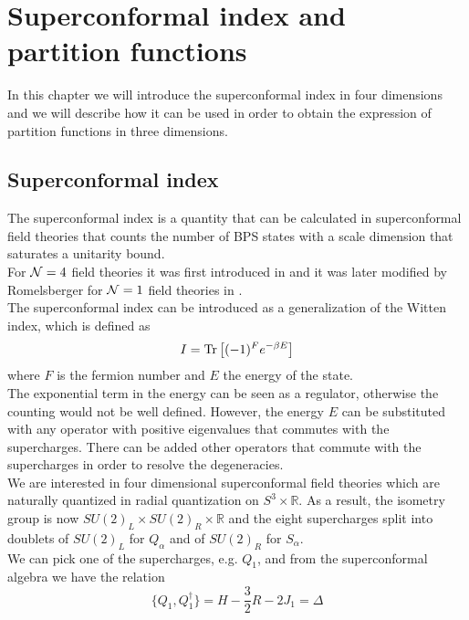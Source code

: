 

\chapter{Superconformal index and partition functions}

In this chapter we will introduce the superconformal index in four dimensions and we will describe how it can be used in order to obtain the expression of partition functions in three dimensions.\\
{\color{red}{ \LARGE Devo Aggiunger qualcosa}}


\section{Superconformal index}
The superconformal index is a quantity that can be calculated in superconformal field theories that counts the number of BPS states with a scale dimension that saturates a unitarity bound.\\
For $\mathcal{N}=4$ field theories it was first introduced in \cite{Kinney:2005ej}
and it was later modified by Romelsberger for $\mathcal{N}=1$ field theories in \cite{Romelsberger:2005eg}.\\
The superconformal index can be introduced as a generalization of the Witten index, which is defined as 
\begin{equation}
I = \mathrm{Tr } \,{ \left[   (-1)^F e^{-\beta E}\right]}
\end{equation}
where $F$ is the fermion number and $E$ the energy of the state.\\
The exponential term in the energy can be seen as a regulator, otherwise the counting would not be well defined.
However, the energy $E$ can be substituted with any operator with positive eigenvalues that commutes with the supercharges. 
There can be added other operators that commute with the supercharges in order to resolve the degeneracies.
\\
We are interested in four dimensional superconformal field theories which are naturally quantized in radial quantization on $S^3 \times \mathbb{R}$. 
As a result, the isometry group is now $SU(2)_L \times SU(2)_R \times \mathbb{R}$ and the eight supercharges split into doublets of $SU(2)_L$ for $Q_{\alpha}$ and of $SU(2)_R$ for $S_{\alpha}$.\\
We can pick one of the supercharges, e.g. $Q_1$, and from the superconformal algebra we have the relation
\begin{equation}
 \{Q_1, Q_1^{\dagger} \} = H - \frac{3}{2} R - 2 J_1 = \Delta
 \end{equation} 
